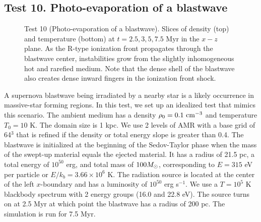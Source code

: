 \documentclass[useAMS,usenatbib,a4paper]{mn2e}
\begin{document}
\subsection{Test 10. Photo-evaporation of a blastwave}

\begin{figure*}
  \caption{\label{fig:test10} Test 10 (Photo-evaporation of a
    blastwave).  Slices of density (top) and temperature (bottom) at
    $t = 2.5, 3, 5, 7.5$ Myr in the $x-z$ plane.  As the R-type
    ionization front propagates through the blastwave center,
    instabilities grow from the slightly inhomogeneous hot and rarefied
    medium.  Note that the dense shell of the blastwave also creates
    dense inward fingers in the ionization front shock.}
\end{figure*}

A supernova blastwave being irradiated by a nearby star is a likely
occurrence in massive-star forming regions.  In this test, we set up an
idealized test that mimics this scenario.  The ambient medium has a
density $\rho_0 = 0.1~\cubecm$ and temperature $T_0 = 10$ K.  The
domain size is 1 kpc.  We use 2 levels of AMR with a base grid of
64$^3$ that is refined if the density or total energy slope is greater
than 0.4.  The blastwave is initialized at the beginning of the
Sedov-Taylor phase when the mass of the swept-up material equals the
ejected material.  It has a radius of 21.5 pc, a total energy of
$10^{50}$ erg, and total mass of $100 \Ms$, corresponding to $E = 315$
eV per particle or $E/k_b = 3.66 \times 10^6$ K.  The radiation source
is located at the center of the left $x$-boundary and has a luminosity
of $10^{50}$ erg s$^{-1}$.  We use a $T=10^5$ K blackbody spectrum
with 2 energy groups (16.0 and 22.8 eV).  The source turns on at 2.5
Myr at which point the blastwave has a radius of 200 pc.  The
simulation is run for 7.5 Myr.
\end{document}

